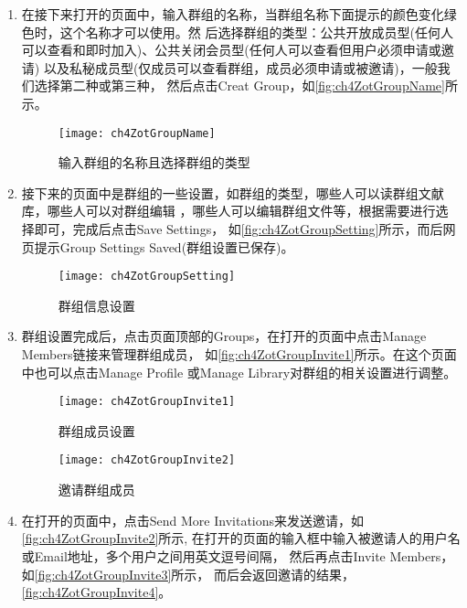 \documentclass[cn,11pt,chinese]{elegantbook}
\begin{document}
\begin{enumerate}
	\item 在接下来打开的页面中，输入群组的名称，当群组名称下面提示的颜色变化绿色时，这个名称才可以使用。然
	后选择群组的类型：公共开放成员型(任何人可以查看和即时加入)、公共关闭会员型(任何人可以查看但用户必须申请或邀请)
	以及私秘成员型(仅成员可以查看群组，成员必须申请或被邀请)，一般我们选择第二种或第三种，
	然后点击Creat Group，如\autoref{fig:ch4ZotGroupName}所示。
	\begin{figure}[htbp]
		\centering
		\texttt{[image: ch4ZotGroupName]}
		\caption{输入群组的名称且选择群组的类型}
		\label{fig:ch4ZotGroupName}
	\end{figure}
	\item 接下来的页面中是群组的一些设置，如群组的类型，哪些人可以读群组文献库，哪些人可以对群组编辑
	，哪些人可以编辑群组文件等，根据需要进行选择即可，完成后点击Save Settings，
	如\autoref{fig:ch4ZotGroupSetting}所示，而后网页提示Group Settings Saved(群组设置已保存)。
	\begin{figure}[htbp]
		\centering
		\texttt{[image: ch4ZotGroupSetting]}
		\caption{群组信息设置}
		\label{fig:ch4ZotGroupSetting}
	\end{figure}
	\item 群组设置完成后，点击页面顶部的Groups，在打开的页面中点击Manage Members链接来管理群组成员，
	如\autoref{fig:ch4ZotGroupInvite1}所示。在这个页面中也可以点击Manage Profile
	或Manage Library对群组的相关设置进行调整。
	\begin{figure}[htbp]
		\centering
		\begin{minipage}[t]{\dimexpr.5\textwidth-1em}
			\centering
			\texttt{[image: ch4ZotGroupInvite1]}
			\caption{群组成员设置}
			\label{fig:ch4ZotGroupInvite1}
		\end{minipage}
		\begin{minipage}[t]{\dimexpr.5\textwidth-1em}
			\centering
			\texttt{[image: ch4ZotGroupInvite2]}
			\caption{邀请群组成员}
			\label{fig:ch4ZotGroupInvite2}	
		\end{minipage}	 
	\end{figure}
	\item 在打开的页面中，点击Send More Invitations来发送邀请，如\autoref{fig:ch4ZotGroupInvite2}所示,
	在打开的页面的输入框中输入被邀请人的用户名或Email地址，多个用户之间用英文逗号间隔，
	然后再点击Invite Members，如\autoref{fig:ch4ZotGroupInvite3}所示，
	而后会返回邀请的结果，\autoref{fig:ch4ZotGroupInvite4}。
	\begin{figure}[t]

\end{figure}
\end{enumerate}
\end{document}
